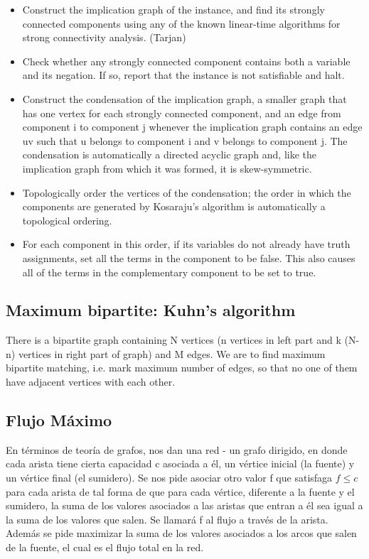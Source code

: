 \documentclass[10pt,letterpaper,twocolumn,twosided]{article}
\newcommand{\codigofuente}[1]{

\dotfill
}
\begin{document}
\begin{itemize}

\item Construct the implication graph of the instance, and find its strongly connected components using any of the known linear-time algorithms for strong connectivity analysis. (Tarjan)


\item Check whether any strongly connected component contains both a variable and its negation. If so, report that the instance is not satisfiable and halt.

\item Construct the condensation of the implication graph, a smaller graph that has one vertex for each strongly connected component, and an edge from component i to component j whenever the implication graph contains an edge uv such that u belongs to component i and v belongs to component j. The condensation is automatically a directed acyclic graph and, like the implication graph from which it was formed, it is skew-symmetric.

\item Topologically order the vertices of the condensation; the order in which the components are generated by Kosaraju's algorithm is automatically a topological ordering.

\item For each component in this order, if its variables do not already have truth assignments, set all the terms in the component to be false. This also causes all of the terms in the complementary component to be set to true.

\end{itemize}

\subsection{Maximum bipartite: Kuhn’s algorithm}
 There is a bipartite graph containing N vertices (n vertices in left part and k (N-n) vertices in right part of graph) and M edges. We are to find maximum bipartite matching, i.e. mark maximum number of edges, so that no one of them have adjacent vertices with each other.
 
 \codigofuente{src/graphs/kuhn.cpp}

\subsection{Flujo Máximo}
En términos de teoría de grafos, nos dan una red - un grafo dirigido, en donde cada arista tiene cierta capacidad c asociada a él, un vértice inicial (la fuente) y un vértice final (el sumidero). Se nos pide asociar otro valor f que satisfaga  $f  \leq c$ para cada arista de tal forma de que para cada vértice, diferente a la fuente y el sumidero, la suma de los valores asociados a las aristas que entran a él sea igual a la suma de los valores que salen. Se llamará f al flujo a través de la arista. Además se pide maximizar la suma de los valores asociados a los arcos que salen de la fuente, el cual es el flujo total en la red.
\end{document}
